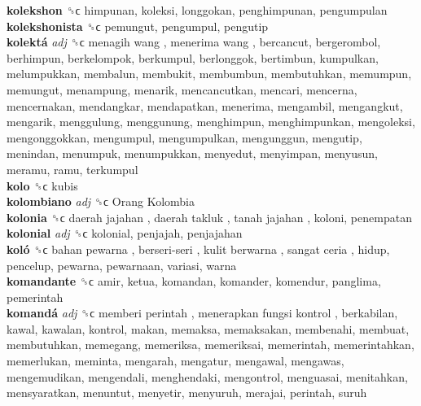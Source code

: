 \textbf{kolekshon} ␝ϲ  himpunan, koleksi, longgokan, penghimpunan, pengumpulan  \\
\textbf{kolekshonista} ␝ϲ  pemungut, pengumpul, pengutip  \\
\textbf{kolektá} \emph{adj}  ␝ϲ   menagih wang ,  menerima wang , bercancut, bergerombol, berhimpun, berkelompok, berkumpul, berlonggok, bertimbun, kumpulkan, melumpukkan, membalun, membukit, membumbun, membutuhkan, memumpun, memungut, menampung, menarik, mencancutkan, mencari, mencerna, mencernakan, mendangkar, mendapatkan, menerima, mengambil, mengangkut, mengarik, menggulung, menggunung, menghimpun, menghimpunkan, mengoleksi, mengonggokkan, mengumpul, mengumpulkan, mengunggun, mengutip, menindan, menumpuk, menumpukkan, menyedut, menyimpan, menyusun, meramu, ramu, terkumpul  \\
\textbf{kolo} ␝ϲ  kubis  \\
\textbf{kolombiano} \emph{adj}  ␝ϲ   Orang Kolombia   \\
\textbf{kolonia} ␝ϲ   daerah jajahan ,  daerah takluk ,  tanah jajahan , koloni, penempatan  \\
\textbf{kolonial} \emph{adj}  ␝ϲ  kolonial, penjajah, penjajahan  \\
\textbf{koló} ␝ϲ   bahan pewarna ,  berseri-seri ,  kulit berwarna ,  sangat ceria , hidup, pencelup, pewarna, pewarnaan, variasi, warna  \\
\textbf{komandante} ␝ϲ  amir, ketua, komandan, komander, komendur, panglima, pemerintah  \\
\textbf{komandá} \emph{adj}  ␝ϲ   memberi perintah ,  menerapkan fungsi kontrol , berkabilan, kawal, kawalan, kontrol, makan, memaksa, memaksakan, membenahi, membuat, membutuhkan, memegang, memeriksa, memeriksai, memerintah, memerintahkan, memerlukan, meminta, mengarah, mengatur, mengawal, mengawas, mengemudikan, mengendali, menghendaki, mengontrol, menguasai, menitahkan, mensyaratkan, menuntut, menyetir, menyuruh, merajai, perintah, suruh  \\
